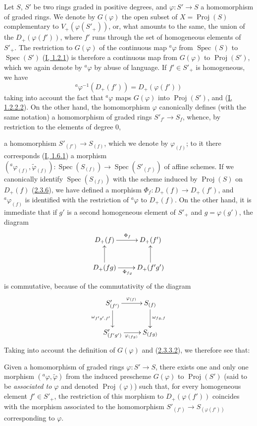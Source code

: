 \begin{env}[2.8.1]
\label{II.2.8.1}
Let $S$, $S'$ be two rings graded in positive degrees, and
$\varphi:S'\to S$ a homomorphism of graded rings. We denote by
$G(\varphi)$ the open subset of $X=\operatorname{Proj}(S)$ complementary to
$V_+(\varphi(S'_+))$, or, what amounts to the same, the union of the
$D_+(\varphi(f'))$, where $f'$ runs through the set of homogeneous elements of
$S'_+$. The restriction to $G(\varphi)$ of the continuous map
${}^a\varphi$ from $\operatorname{Spec}(S)$ to $\operatorname{Spec}(S')$
(\hyperref[I.1.2.1]{I, 1.2.1}) is therefore a continuous map from
$G(\varphi)$ to $\operatorname{Proj}(S')$, which we again denote by
${}^a\varphi$ by abuse of language. If $f'\in S'_+$ is homogeneous, we have
\[
\label{II.2.8.1.1}
  {}^a\varphi^{-1}(D_+(f'))=D_+(\varphi(f'))
\tag{2.8.1.1}
\]
taking into account the fact that ${}^a\varphi$ maps $G(\varphi)$ into
$\operatorname{Proj}(S')$, and (\hyperref[I.1.2.2.2]{I, 1.2.2.2}). On the
other hand, the homomorphism $\varphi$ canonically defines (with the same
notation) a homomorphism of graded rings $S'_{f'}\to S_f$, whence, by
restriction to the elements of degree $0$,

a homomorphism $S'_{(f')}\to S_{(f)}$, which we denote by
$\varphi_{(f)}$; to it there corresponds
(\hyperref[I.1.6.1]{I, 1.6.1}) a morphism
$({}^a\varphi_{(f)},\widetilde{\varphi}_{(f)}):
\operatorname{Spec}(S_{(f)})\to\operatorname{Spec}(S'_{(f')})$ of affine
schemes. If we canonically identify $\operatorname{Spec}(S_{(f)})$ with the
scheme induced by $\operatorname{Proj}(S)$ on $D_+(f)$
(\hyperref[II.2.3.6]{2.3.6}), we have defined a morphism
$\Phi_f:D_+(f)\to D_+(f')$, and ${}^a\varphi_{(f)}$ is identified with the
restriction of ${}^a\varphi$ to $D_+(f)$. On the other hand, it is immediate
that if $g'$ is a second homogeneous element of $S'_+$ and $g=\varphi(g')$,
the diagram
\[
  \xymatrix{
    D_+(f)\ar[r]^{\Phi_f} & D_+(f')\\
    D_+(fg)\ar[u]\ar[r]_{\Phi_{fg}} & D_+(f'g')\ar[u]
  }
\]
is commutative, because of the commutativity of the diagram
\[
  \xymatrix{
    S'_{(f')}\ar[r]^{\varphi_{(f)}}\ar[d]_{\omega_{f'g',f'}}
    & S_{(f)}\ar[d]^{\omega_{fg,f}}\\
    S'_{(f'g')}\ar[r]_{\varphi_{(fg)}} & S_{(fg)}
  }
\]
Taking into account the definition of $G(\varphi)$ and
(\hyperref[II.2.3.3.2]{2.3.3.2}), we therefore see that:
\end{env}

\begin{proposition}[2.8.2]
\label{II.2.8.2}
Given a homomorphism of graded rings $\varphi:S'\to S$, there exists one and
only one morphism $({}^a\varphi,\widetilde{\varphi})$ from the induced
prescheme $G(\varphi)$ to $\operatorname{Proj}(S')$ (said to be
\emph{associated to $\varphi$} and denoted $\operatorname{Proj}(\varphi)$) such
that, for every homogeneous element $f'\in S'_+$, the restriction of this
morphism to $D_+(\varphi(f'))$ coincides with the morphism associated to the
homomorphism $S'_{(f')}\to S_{(\varphi(f'))}$ corresponding to $\varphi$.
\end{proposition}

